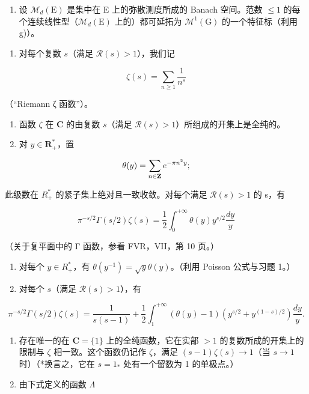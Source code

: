 \begin{enumerate}
\def\labelenumi{\alph{enumi})}
\setcounter{enumi}{7}
\tightlist
\item
  设 \(\mathcal{M}_{d}(\mathrm{E})\) 是集中在 E 上的弥散测度所成的 Banach 空间。范数 \(\leqslant 1\) 的每个连续线性型（\(\mathcal{M}_{d}(\mathrm{E})\) 上的）都可延拓为 \(\mathcal{M}^{1}(\mathrm{G})\) 的一个特征标（利用 g)）。
\end{enumerate}

\begin{enumerate}
\def\labelenumi{\arabic{enumi})}
\setcounter{enumi}{15}
\tightlist
\item
  对每个复数 \(s\)（满足 \(\mathcal{R}(s) > 1\)），我们记
\end{enumerate}

\[
\zeta (s) = \sum_ {n \geqslant 1} \frac {1}{n ^ {s}}
\]

（“Riemann ζ 函数”）。

\begin{enumerate}
\def\labelenumi{\alph{enumi})}
\item
  函数 \(\zeta\) 在 \(\mathbf{C}\) 的由复数 \(s\)（满足 \(\mathcal{R}(s) > 1\)）所组成的开集上是全纯的。
\item
  对 \(y\in \mathbf{R}_+^*\)，置
\end{enumerate}

\[
\theta (y) = \sum_ {n \in {\bf Z}} e ^ {- \pi n ^ {2} y};
\]

此级数在 \(R_{+}^{*}\) 的紧子集上绝对且一致收敛。对每个满足 \(\mathcal{R}(s)>1\) 的 s，有

\[
\pi^ {- s / 2} \Gamma (s / 2) \zeta (s) = \frac {1}{2} \int_ {0} ^ {+ \infty} \theta (y) y ^ {s / 2} \frac {d y}{y}
\]

（关于复平面中的 Γ 函数，参看 FVR，VII，第 10 页。）

\begin{enumerate}
\def\labelenumi{\alph{enumi})}
\setcounter{enumi}{2}
\item
  对每个 \(y \in R_{+}^{*}\)，有 \(\theta(y^{-1}) = \sqrt{y}\theta(y)\)。（利用 Poisson 公式与习题 1。）
\item
  对每个 \(s\)（满足 \(\mathcal{R}(s) > 1\)），有
\end{enumerate}

\[
\pi^ {- s / 2} \Gamma (s / 2) \zeta (s) = \frac {1}{s (s - 1)} + \frac {1}{2} \int_ {1} ^ {+ \infty} (\theta (y) - 1) (y ^ {s / 2} + y ^ {(1 - s) / 2}) \frac {d y}{y}.
\]

\begin{enumerate}
\def\labelenumi{\alph{enumi})}
\setcounter{enumi}{4}
\item
  存在唯一的在 \(\mathbf{C} = \{1\}\) 上的全纯函数，它在实部 \(>1\) 的复数所成的开集上的限制与 \(\zeta\) 相一致。这个函数仍记作 \(\zeta\)，满足 \((s - 1)\zeta(s) \to 1\)（当 \(s \to 1\) 时）（*换言之，它在 \(s = 1_*\) 处有一个留数为 1 的单极点。）
\item
  由下式定义的函数 \(\Lambda\)
\end{enumerate}

